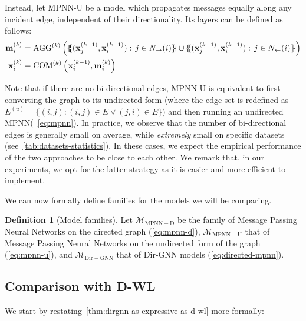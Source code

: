 \documentclass{article}
\newcommand{\inp}{\leftarrow}
\newcommand{\out}{\rightarrow}
\newcommand\oursacro{Dir-GNN}
\newcommand\m{m}
\newcommand\ilayer{k}
\newcommand*{\ldblbrace}{\{\mskip-6mu\{}
\newcommand*{\rdblbrace}{\}\mskip-6mu\}}
\theoremstyle{plain}
\theoremstyle{definition}
\newtheorem{definition}[theorem]{Definition}
\theoremstyle{remark}
\begin{document}
Instead, let MPNN-U be a model which propagates messages equally along any incident edge, independent of their directionality. Its layers can be defined as follows:
\begin{align}
\begin{split}
\mathbf{\m}^{(\ilayer)}_{i} &=  \mathrm{AGG}^{(\ilayer)}\left(\ldblbrace (\mathbf{x}_{j}^{(\ilayer-1)}, \mathbf{x}_{i}^{(\ilayer-1)}):\, j \in N_\out(i) \rdblbrace \cup \ldblbrace (\mathbf{x}_{j}^{(\ilayer-1)}, \mathbf{x}_{i}^{(\ilayer-1)}):\, j \in N_\inp(i) \rdblbrace \right) \\
\mathbf{x}_{i}^{(\ilayer)}   &=  \mathrm{COM}^{(\ilayer)}\left(\mathbf{x}_i^{(\ilayer-1)}, \mathbf{\m}^{(\ilayer)}_i\right) \label{eq:mpnn-u}
\end{split}
\end{align}

Note that if there are no bi-directional edges, MPNN-U is equivalent to first converting the graph to its undirected form (where the edge set is redefined as $E^{(u)}=\{ 
(i, j): (i, j) \in E \lor (j, i) \in E \}$) and then running an undirected MPNN(~\cref{eq:mpnn}). In practice, we observe that the number of bi-directional edges is generally small on average, while \emph{extremely} small on specific datasets (see~\cref{tab:datasets-statistics}). In these cases, we expect the empirical performance of the two approaches to be close to each other. We remark that, in our experiments, we opt for the latter strategy as it is easier and more efficient to implement.

We can now formally define families for the models we will be comparing.

\begin{definition}[Model families] \label{def:model_families}
    Let $\mathcal{M}_\mathrm{MPNN-D}$ be the family of Message Passing Neural Networks on the directed graph (\cref{eq:mpnn-d}), $\mathcal{M}_\mathrm{MPNN-U}$ that of Message Passing Neural Networks on the undirected form of the graph (\cref{eq:mpnn-u}), and $\mathcal{M}_\mathrm{\oursacro{}}$ that of \oursacro{} models (\cref{eq:directed-mpnn}).
\end{definition}

\subsection{Comparison with D-WL} \label{app:d-wl-proof}

We start by restating~\cref{thm:dirgnn-as-expressive-as-d-wl} more formally:
\end{document}
